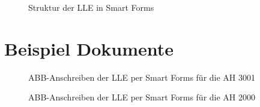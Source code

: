 \begin{figure}[ht]
	\centering
	\caption{Struktur der \acs{LLE} in Smart Forms}
	\label{AN:Smart3}
\end{figure}

\FloatBarrier

\section {Beispiel Dokumente}

\begin{figure}[ht] 
	\caption{ABB-Anschreiben der \acs{LLE} per Smart Forms für die \acs{AH} 3001}
		\label{AN:lleat}
\end{figure} 

\begin{figure}[ht] 
	\caption{ABB-Anschreiben der \acs{LLE} per Smart Forms für die \acs{AH} 2000}
	\label{AN:llebj}
\end{figure} 

